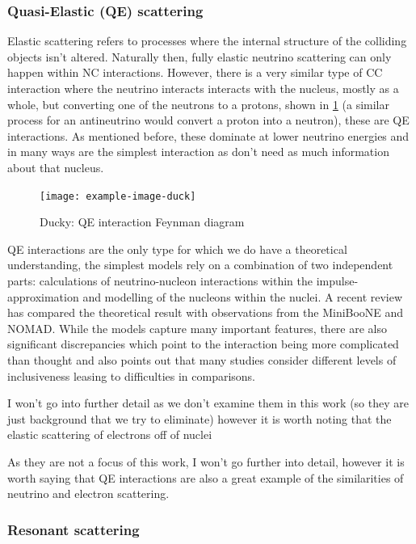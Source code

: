 \documentclass[a4paper,12pt]{article}
\begin{document}
\subsubsection{Quasi-Elastic (QE) scattering}
Elastic scattering refers to processes where the internal structure of the colliding objects isn't altered.
Naturally then, fully elastic neutrino scattering can only happen within NC interactions.
However, there is a very similar type of CC interaction where the neutrino interacts interacts with the nucleus, mostly as a whole, but converting one of the neutrons to a protons, shown in \cref{fig:QE_fd} (a similar process for an antineutrino would convert a proton into a neutron), these are QE interactions.
As mentioned before, these dominate at lower neutrino energies and in many ways are the simplest interaction as don't need as much information about that nucleus.

\begin{figure}[h]
\centering
    \texttt{[image: example-image-duck]}
    \caption{
        Ducky: QE interaction Feynman diagram
    }\label{fig:QE_fd}
\end{figure}

QE interactions are the only type for which we do have a theoretical understanding, the simplest models rely on a combination of two independent parts: calculations of neutrino-nucleon interactions within the impulse-approximation and modelling of the nucleons within the nuclei.
A recent review \cite{gallagherNeutrinoNucleusInteractions2011} has compared the theoretical result with observations from the MiniBooNE and NOMAD.
While the models capture many important features, there are also significant discrepancies which point to the interaction being more complicated than thought and also points out that many studies consider different levels of inclusiveness leasing to difficulties in comparisons.

I won't go into further detail as we don't examine them in this work (so they are just background that we try to eliminate) however it is worth noting that the elastic scattering of electrons off of nuclei 

As they are not a focus of this work, I won't go further into detail, however it is worth saying that QE interactions are also a great example of the similarities of neutrino and electron scattering.

\subsubsection{Resonant scattering}
\end{document}
